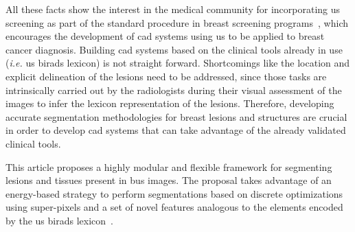 All these facts show the interest in the medical community for incorporating \ac{us} screening as part of the standard procedure in breast screening programs~\cite{biradsus}, which encourages the development of \ac{cad} systems using \ac{us} to be applied to breast cancer diagnosis.
Building \ac{cad} systems based on the clinical tools already in use (\emph{i.e.} \ac{us} \ac{birads} lexicon) is not straight forward.
Shortcomings like the location and explicit delineation of the lesions need to be addressed, since those tasks are intrinsically carried out by the radiologists during their visual assessment of the images to infer the lexicon representation of the lesions.
Therefore, developing accurate segmentation methodologies for breast lesions and structures are crucial in order to develop \ac{cad} systems that can take advantage of the already validated clinical tools.

%

This article proposes a highly modular and flexible framework for segmenting lesions and tissues present in \ac{bus} images.
The proposal takes advantage of an energy-based strategy to perform segmentations based on discrete optimizations using super-pixels and a set of novel features analogous to the elements encoded by the \ac{us} \ac{birads} lexicon~\cite{biradsus}.

